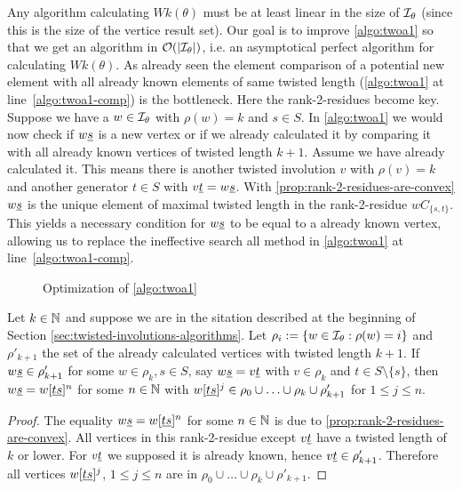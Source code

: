 Any algorithm calculating $Wk(\theta)$ must be at least linear in the size of $\mathcal{I}_{\theta}$ (since this is the size of the vertice result set). Our goal is to improve \ref{algo:twoa1} so that we get an algorithm in $\mathcal{O}(|\mathcal{I}_{\theta}|)$, i.e. an asymptotical perfect algorithm for calculating $Wk(\theta)$. As already seen the element comparison of a potential new element with all already known elements of same twisted length (\ref{algo:twoa1} at line~\ref{algo:twoa1-comp}) is the bottleneck. Here the rank-2-residues become key. Suppose we have a $w \in \mathcal{I}_{\theta}$ with $\rho(w) = k$ and $s \in S$. In \ref{algo:twoa1} we would now check if $w \underline{s}$ is a new vertex or if we already calculated it by comparing it with all already known vertices of twisted length $k + 1$. Assume we have already calculated it. This means there is another twisted involution $v$ with $\rho(v) = k$ and another generator $t \in S$ with $v \underline{t} = w \underline{s}$. With \ref{prop:rank-2-residues-are-convex} $w \underline{s}$ is the unique element of maximal twisted length in the rank-2-residue $wC_{\{s,t\}}$. This yields a necessary condition for $w \underline{s}$ to be equal to a already known vertex, allowing us to replace the ineffective search all method in \ref{algo:twoa1} at line~\ref{algo:twoa1-comp}.

\begin{figure}[ht]
	\centering
	
	\caption{Optimization of \ref{algo:twoa1}}
	\label{fig:optimization-of-twoa1}
\end{figure}

\begin{coro}
	Let $k \in \mathbb{N}$ and suppose we are in the sitation described at the beginning of Section \ref{sec:twisted-involutions-algorithms}. Let $\rho_i := \{ w \in \mathcal{I}_{\theta} : \rho(w) = i \}$ and $\rho'_{k+1}$ the set of the already calculated vertices with twisted length $k+1$. If $w \underline{s} \in \rho'_{k+1}$ for some $w \in \rho_k, s \in S$, say $w \underline{s} = v \underline{t}$ with $v \in \rho_k$ and $t \in S \setminus \{s\}$, then $w \underline{s} = w[\underline{t} \underline{s}]^n$ for some $n \in \mathbb{N}$ with $w[\underline{t} \underline{s}]^j \in \rho_0 \cup \ldots \cup \rho_k \cup \rho'_{k+1}$ for $1 \leq j \leq n$.

	\begin{proof}
		The equality $w \underline{s} = w[\underline{t} \underline{s}]^n$ for some $n \in \mathbb{N}$ is due to \ref{prop:rank-2-residues-are-convex}. All vertices in this rank-2-residue except $v \underline{t}$ have a twisted length of $k$ or lower. For $v \underline{t}$ we supposed it is already known, hence $v \underline{t} \in \rho'_{k+1}$. Therefore all vertices $w[\underline{t} \underline{s}]^j$, $1 \leq j \leq n$ are in $\rho_0 \cup \ldots \cup \rho_k \cup \rho'_{k+1}$.
	\end{proof}
\end{coro}


